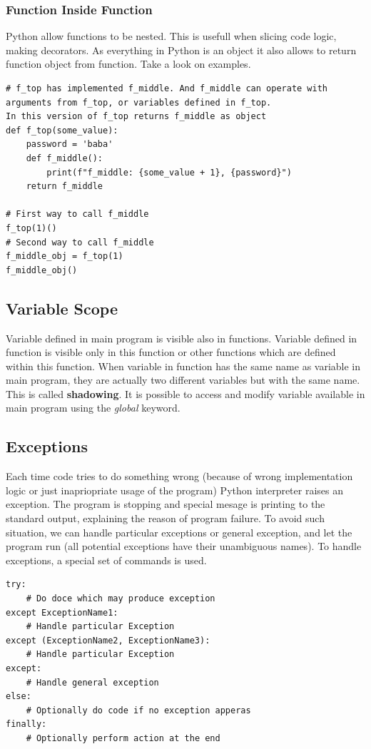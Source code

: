 \documentclass{article}
\begin{document}
	\subsubsection{Function Inside Function}
	Python allow functions to be nested. This is usefull when slicing code logic, making decorators. As everything in Python is an object it also allows to return function object from function. Take a look on examples.
	\begin{lstlisting}[style=pystyle]
# f_top has implemented f_middle. And f_middle can operate with arguments from f_top, or variables defined in f_top.
In this version of f_top returns f_middle as object
def f_top(some_value):
    password = 'baba'
    def f_middle():
        print(f"f_middle: {some_value + 1}, {password}")
    return f_middle

# First way to call f_middle
f_top(1)()
# Second way to call f_middle
f_middle_obj = f_top(1)
f_middle_obj()
	\end{lstlisting}
	
	
	
	\newpage
	\subsection{Variable Scope}
	Variable defined in main program is visible also in functions. Variable defined in function is visible only in this function or other functions which are defined within this function. When variable in function has the same name as variable in main program, they are actually two different variables but with the same name. This is called \textbf{shadowing}. It is possible to access and modify variable available in main program using the \textit{global} keyword. 



\newpage
\subsection{Exceptions} 
Each time code tries to do something wrong (because of wrong implementation logic or just inapriopriate usage of the program) Python interpreter raises an exception. The program is stopping and special mesage is printing to the standard output, explaining the reason of program failure. To avoid such situation, we can handle particular exceptions or general exception, and let the program run (all potential exceptions have their unambiguous names). 
To handle exceptions, a special set of commands is used. 
\begin{lstlisting}[style=pystyle]
try:
	# Do doce which may produce exception
except ExceptionName1:
	# Handle particular Exception
except (ExceptionName2, ExceptionName3):
	# Handle particular Exception
except:
	# Handle general exception
else:
	# Optionally do code if no exception apperas
finally:
	# Optionally perform action at the end
\end{lstlisting}
\end{document}
